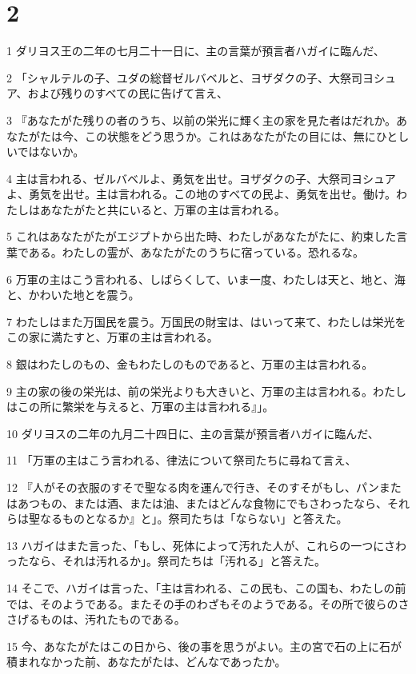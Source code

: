 \chapter{2}

\par 1 ダリヨス王の二年の七月二十一日に、主の言葉が預言者ハガイに臨んだ、
\par 2 「シャルテルの子、ユダの総督ゼルバベルと、ヨザダクの子、大祭司ヨシュア、および残りのすべての民に告げて言え、
\par 3 『あなたがた残りの者のうち、以前の栄光に輝く主の家を見た者はだれか。あなたがたは今、この状態をどう思うか。これはあなたがたの目には、無にひとしいではないか。
\par 4 主は言われる、ゼルバベルよ、勇気を出せ。ヨザダクの子、大祭司ヨシュアよ、勇気を出せ。主は言われる。この地のすべての民よ、勇気を出せ。働け。わたしはあなたがたと共にいると、万軍の主は言われる。
\par 5 これはあなたがたがエジプトから出た時、わたしがあなたがたに、約束した言葉である。わたしの霊が、あなたがたのうちに宿っている。恐れるな。
\par 6 万軍の主はこう言われる、しばらくして、いま一度、わたしは天と、地と、海と、かわいた地とを震う。
\par 7 わたしはまた万国民を震う。万国民の財宝は、はいって来て、わたしは栄光をこの家に満たすと、万軍の主は言われる。
\par 8 銀はわたしのもの、金もわたしのものであると、万軍の主は言われる。
\par 9 主の家の後の栄光は、前の栄光よりも大きいと、万軍の主は言われる。わたしはこの所に繁栄を与えると、万軍の主は言われる』」。
\par 10 ダリヨスの二年の九月二十四日に、主の言葉が預言者ハガイに臨んだ、
\par 11 「万軍の主はこう言われる、律法について祭司たちに尋ねて言え、
\par 12 『人がその衣服のすそで聖なる肉を運んで行き、そのすそがもし、パンまたはあつもの、または酒、または油、またはどんな食物にでもさわったなら、それらは聖なるものとなるか』と」。祭司たちは「ならない」と答えた。
\par 13 ハガイはまた言った、「もし、死体によって汚れた人が、これらの一つにさわったなら、それは汚れるか」。祭司たちは「汚れる」と答えた。
\par 14 そこで、ハガイは言った、「主は言われる、この民も、この国も、わたしの前では、そのようである。またその手のわざもそのようである。その所で彼らのささげるものは、汚れたものである。
\par 15 今、あなたがたはこの日から、後の事を思うがよい。主の宮で石の上に石が積まれなかった前、あなたがたは、どんなであったか。
